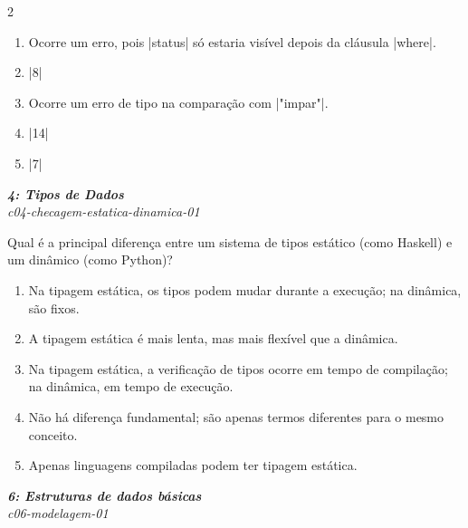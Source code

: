 \documentclass[a4paper,10pt,brazil]{article}
\begin{document}
\begin{multicols}{2}
\begin{enumerate}
  \item Ocorre um erro, pois \haskellinline|status| só estaria visível depois da cláusula \haskellinline|where|.

  \item \haskellinline|8|

  \item Ocorre um erro de tipo na comparação com \haskellinline|"impar"|.

  \item \haskellinline|14|

  \item \haskellinline|7|


\end{enumerate}

\begin{flushright}
  \footnotesize
  \textit{\textbf{4: Tipos de Dados}}\\
  \textit{c04-checagem-estatica-dinamica-01}\\

\end{flushright}
Qual é a principal diferença entre um sistema de tipos estático (como Haskell) e um dinâmico (como Python)?

\begin{enumerate}
  \item Na tipagem estática, os tipos podem mudar durante a execução; na dinâmica, são fixos.

  \item A tipagem estática é mais lenta, mas mais flexível que a dinâmica.

  \item Na tipagem estática, a verificação de tipos ocorre em tempo de compilação; na dinâmica, em tempo de execução.

  \item Não há diferença fundamental; são apenas termos diferentes para o mesmo conceito.

  \item Apenas linguagens compiladas podem ter tipagem estática.


\end{enumerate}

\begin{flushright}
  \footnotesize
  \textit{\textbf{6: Estruturas de dados básicas}}\\
  \textit{c06-modelagem-01}\\


\end{flushright}
\end{multicols}
\end{document}
